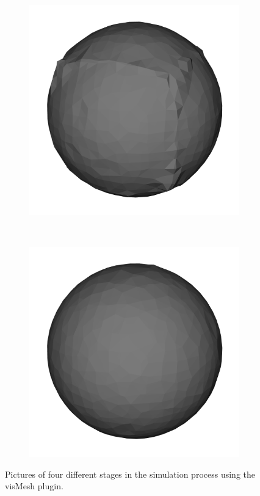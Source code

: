 \documentclass[12pt,t]{beamer}
\begin{document}
\begin{frame}
\begin{figure}
        \begin{subfigure}[t]{0.3\textwidth}
                \includegraphics[width=\textwidth]{img/maya2.png}
        \end{subfigure}%
        ~ %
        \begin{subfigure}[t]{0.3\textwidth}
                \includegraphics[width=\textwidth]{img/maya3.png}
        \end{subfigure}
        \caption{Pictures of four different stages in the simulation process using
                 the visMesh plugin.}
        \label{fig:vismesh}
\end{figure}
\end{frame}
\end{document}
